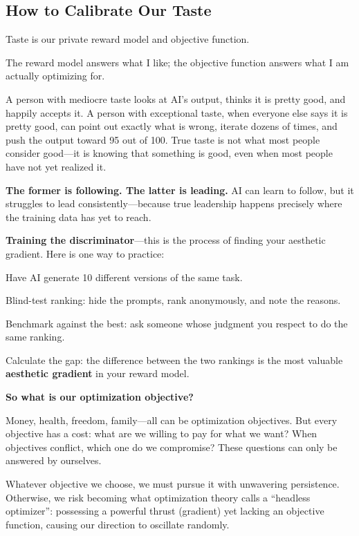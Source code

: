 \newpage

\subsection{How to Calibrate Our Taste}

Taste is our private reward model and objective function.

The reward model answers what I like; the objective function answers what I am actually optimizing for.

A person with mediocre taste looks at AI's output, thinks it is pretty good, and happily accepts it. A person with exceptional taste, when everyone else says it is pretty good, can point out exactly what is wrong, iterate dozens of times, and push the output toward 95 out of 100. True taste is not what most people consider good---it is knowing that something is good, even when most people have not yet realized it.

\textbf{The former is following. The latter is leading.} AI can learn to follow, but it struggles to lead consistently---because true leadership happens precisely where the training data has yet to reach.

\vspace{1em}

\textbf{Training the discriminator}---this is the process of finding your aesthetic gradient. Here is one way to practice:

Have AI generate 10 different versions of the same task.

Blind-test ranking: hide the prompts, rank anonymously, and note the reasons.

Benchmark against the best: ask someone whose judgment you respect to do the same ranking.

Calculate the gap: the difference between the two rankings is the most valuable \textbf{aesthetic gradient} in your reward model.

\vspace{1em}

\textbf{So what is our optimization objective?}

Money, health, freedom, family---all can be optimization objectives. But every objective has a cost: what are we willing to pay for what we want? When objectives conflict, which one do we compromise? These questions can only be answered by ourselves.

Whatever objective we choose, we must pursue it with unwavering persistence. Otherwise, we risk becoming what optimization theory calls a ``headless optimizer'': possessing a powerful thrust (gradient) yet lacking an objective function, causing our direction to oscillate randomly.

